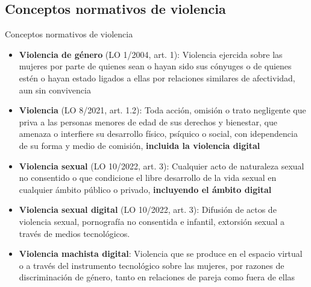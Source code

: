 \documentclass{beamer}
\begin{document}
    \subsection{Conceptos normativos de violencia}
    \begin{frame}{Conceptos normativos de violencia}
        \begin{itemize}
            \footnotesize
            \item \textbf{Violencia de género} (LO 1/2004, art. 1): Violencia ejercida sobre las mujeres por parte de
            quienes sean o hayan sido sus cónyuges o de quienes estén o hayan estado ligados a ellas por relaciones
            similares de afectividad, aun sin convivencia
            \item \textbf{Violencia} (LO 8/2021, art. 1.2): Toda acción, omisión o trato negligente que priva a las
            personas menores de edad de sus derechos y bienestar, que amenaza o interfiere su desarrollo físico,
            psíquico o social, con idependencia de su forma y medio de comisión, \textbf{incluida la violencia digital}
            \item \textbf{Violencia sexual} (LO 10/2022, art. 3): Cualquier acto de naturaleza sexual no consentido o
            que condicione el libre desarrollo de la vida sexual en cualquier ámbito público o privado,
            \textbf{incluyendo el ámbito digital}
            \item \textbf{Violencia sexual digital} (LO 10/2022, art. 3): Difusión de actos de violencia sexual, pornografía no consentida e infantil, extorsión sexual a través de medios tecnológicos.
            \item \textbf{Violencia machista digital}: Violencia que se produce en el espacio virtual o a través del
            instrumento tecnológico sobre las mujeres, por razones de discriminación de género, tanto en relaciones de
            pareja como fuera de ellas
        \end{itemize}
    \end{frame}
\end{document}
